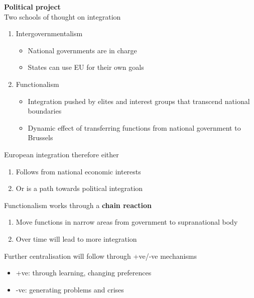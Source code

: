 \documentclass{beamer}
\begin{document}
\begin{frame}
  \textbf{Political project}\\
  Two schools of thought on integration
  \begin{enumerate}
    \item Intergovernmentalism
    \begin{itemize}
      \item National governments are in charge
      \item States can use EU for their own goals
    \end{itemize}
    \medskip
    \item Functionalism
    \begin{itemize}
      \item Integration pushed by elites and interest groups that transcend national boundaries
      \item Dynamic effect of transferring functions from national government to Brussels
    \end{itemize}
  \end{enumerate}
\end{frame}

\begin{frame}
  European integration therefore either
  \begin{enumerate}
    \item Follows from national economic interests
    \medskip
    \item Or is a path towards political integration
  \end{enumerate}  
\end{frame}

\begin{frame}
  Functionalism works through a \textbf{chain reaction}
  \begin{enumerate}
    \item Move functions in narrow areas from government to supranational body
    \item Over time will lead to more integration 
  \end{enumerate}
  \medskip
  Further centralisation will follow through +ve/-ve mechanisms
  \begin{itemize}
    \item +ve: through learning, changing preferences
    \item -ve: generating problems and crises
  \end{itemize}
\end{frame}
\end{document}
